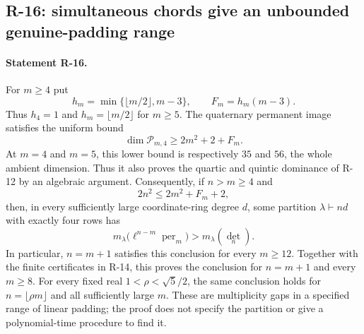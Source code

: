 \documentclass[11pt,a4paper]{article}
\theoremstyle{definition}\newtheorem{definition}{Definition}
\begin{document}
\subsection{R-16: simultaneous chords give an unbounded genuine-padding range}

\paragraph{Statement R-16.}
For $m\geq4$ put
\[
 h_m=\min\{\lfloor m/2\rfloor,m-3\},\qquad
 F_m=h_m(m-3).
\]
Thus $h_4=1$ and $h_m=\lfloor m/2\rfloor$ for $m\geq5$.
The quaternary permanent image satisfies the uniform bound
\begin{equation}\label{R16:dimension}
 \dim\mathcal P_{m,4}\geq 2m^2+2+F_m.
\end{equation}
At $m=4$ and $m=5$, this lower bound is respectively $35$ and
$56$, the whole ambient dimension. Thus it also proves the
quartic and quintic dominance of R-12 by an algebraic argument.
Consequently, if $n>m\geq4$ and
\begin{equation}\label{R16:paddingrange}
 2n^2\leq2m^2+F_m+2,
\end{equation}
then, in every sufficiently large coordinate-ring degree $d$,
some partition $\lambda\vdash nd$ with exactly four rows has
\[
 m_\lambda\bigl(\ell^{n-m}\operatorname{per}_m\bigr)
   >m_\lambda(\det_n).
\]
In particular, $n=m+1$ satisfies this conclusion for every
$m\geq12$. Together with the finite certificates in R-14,
this proves the conclusion for $n=m+1$ and every $m\geq8$.
For every fixed real $1<\rho<\sqrt5/2$, the same conclusion
holds for $n=\lfloor\rho m\rfloor$ and all sufficiently large
$m$. These are multiplicity gaps in a specified range of
linear padding; the proof does not specify the partition or
give a polynomial-time procedure to find it.
\end{document}
